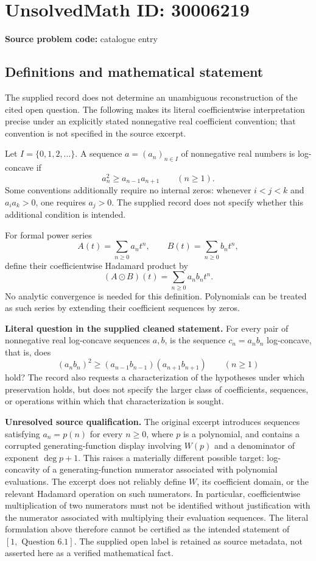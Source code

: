 \documentclass[11pt]{article}
\begin{document}
\section*{UnsolvedMath ID: 30006219}
\textbf{Source problem code:} catalogue entry
\subsection{Definitions and mathematical statement}
The supplied record does not determine an unambiguous reconstruction of the cited open question. The following makes its literal coefficientwise interpretation precise under an explicitly stated nonnegative real coefficient convention; that convention is not specified in the source excerpt.

Let \(I=\{0,1,2,\ldots\}\). A sequence \(a=(a_n)_{n\in I}\) of nonnegative real numbers is log-concave if
\[
 a_n^2\geq a_{n-1}a_{n+1}\qquad(n\geq1).
\]
Some conventions additionally require no internal zeros: whenever \(i<j<k\) and \(a_i a_k>0\), one requires \(a_j>0\). The supplied record does not specify whether this additional condition is intended.

For formal power series
\[
 A(t)=\sum_{n\geq0}a_nt^n,\qquad B(t)=\sum_{n\geq0}b_nt^n,
\]
define their coefficientwise Hadamard product by
\[
 (A\odot B)(t)=\sum_{n\geq0}a_nb_nt^n.
\]
No analytic convergence is needed for this definition. Polynomials can be treated as such series by extending their coefficient sequences by zeros.

\textbf{Literal question in the supplied cleaned statement.} For every pair of nonnegative real log-concave sequences \(a,b\), is the sequence \(c_n=a_nb_n\) log-concave, that is, does
\[
 (a_nb_n)^2\geq(a_{n-1}b_{n-1})(a_{n+1}b_{n+1})\qquad(n\geq1)
\]
hold? The record also requests a characterization of the hypotheses under which preservation holds, but does not specify the larger class of coefficients, sequences, or operations within which that characterization is sought.

\textbf{Unresolved source qualification.} The original excerpt introduces sequences satisfying \(a_n=p(n)\) for every \(n\geq0\), where \(p\) is a polynomial, and contains a corrupted generating-function display involving \(W(p)\) and a denominator of exponent \(\deg p+1\). This raises a materially different possible target: log-concavity of a generating-function numerator associated with polynomial evaluations. The excerpt does not reliably define \(W\), its coefficient domain, or the relevant Hadamard operation on such numerators. In particular, coefficientwise multiplication of two numerators must not be identified without justification with the numerator associated with multiplying their evaluation sequences. The literal formulation above therefore cannot be certified as the intended statement of \([1,\text{ Question }6.1]\). The supplied open label is retained as source metadata, not asserted here as a verified mathematical fact.
\end{document}

